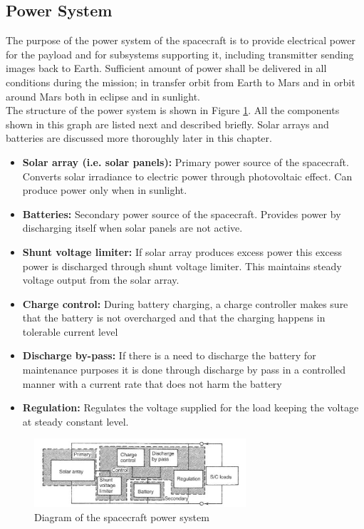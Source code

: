 \documentclass[a4paper, oneside, 11pt]{article}
\begin{document}
\subsection{Power System}
The purpose of the power system of the spacecraft is to provide electrical power for the payload and for subsystems supporting it, including transmitter sending images back to Earth. Sufficient amount of power shall be delivered in all conditions during the mission; in transfer orbit from Earth to Mars and in orbit around Mars both in eclipse and in sunlight.\\
The structure of the power system is shown in Figure \ref{picture_power_system_diagram}. All the components shown in this graph are listed next and described briefly. Solar arrays and batteries are discussed more thoroughly later in this chapter. 

\begin{itemize}
\item \textbf{Solar array (i.e. solar panels):} Primary power source of the spacecraft. Converts solar irradiance to electric power through photovoltaic effect. Can produce power only when in sunlight.
\item \textbf{Batteries:} Secondary power source of the spacecraft. Provides power by discharging itself when solar panels are not active.
\item \textbf{Shunt voltage limiter:} If solar array produces excess power this excess power is discharged through shunt voltage limiter. This maintains steady voltage output from the solar array. \cite{Shunt voltage limiter}
\item \textbf{Charge control:} During battery charging, a charge controller makes sure that the battery is not overcharged and that the charging happens in tolerable current level
\item \textbf{Discharge by-pass:} If there is a need to discharge the battery for maintenance purposes it is done through discharge by pass in a controlled manner with a current rate that does not harm the battery
\item \textbf{Regulation:} Regulates the voltage supplied for the load keeping the voltage at steady constant level.
\end{itemize}

\begin{figure}[H]
	\centering 
	\includegraphics[width=0.7\textwidth]
    {Pictures/power_system_diagram.JPG}
    \caption{Diagram of the spacecraft power system \cite{Power Systems Lecture EF2260}}
    \label{picture_power_system_diagram}
\end{figure}
\end{document}
